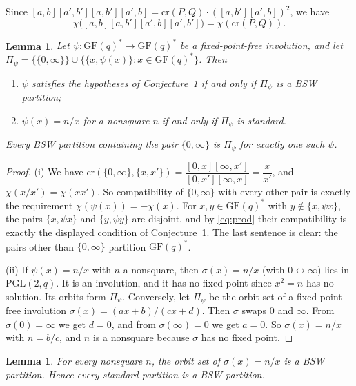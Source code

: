 \documentclass[11pt,a4paper]{article}
\newtheorem{lemma}[theorem]{Lemma}
\theoremstyle{definition}
\theoremstyle{remark}
\newcommand{\GF}{\mathrm{GF}}
\newcommand{\PGL}{\mathrm{PGL}}
\newcommand{\cro}{\mathrm{cr}}
\begin{document}
Since $[a,b][a',b'][a,b'][a',b]=\cro(P,Q)\cdot([a,b'][a',b])^2$, we have
\begin{equation}\label{eq:prod}
  \chi\bigl([a,b][a,b'][a',b][a',b']\bigr)=\chi(\cro(P,Q)).
\end{equation}

\begin{lemma}\label{lem:dict}
Let $\psi:\GF(q)^*\to\GF(q)^*$ be a fixed-point-free involution, and let
$\Pi_\psi=\{\{0,\infty\}\}\cup\{\{x,\psi(x)\}:x\in\GF(q)^*\}$. Then
\begin{enumerate}
\item[(i)] $\psi$ satisfies the hypotheses of Conjecture~1 if and only if $\Pi_\psi$ is a BSW partition;
\item[(ii)] $\psi(x)=n/x$ for a nonsquare $n$ if and only if $\Pi_\psi$ is standard.
\end{enumerate}
Every BSW partition containing the pair $\{0,\infty\}$ is $\Pi_\psi$ for exactly one such $\psi$.
\end{lemma}

\begin{proof}
(i) We have $\cro(\{0,\infty\},\{x,x'\})=\dfrac{[0,x][\infty,x']}{[0,x'][\infty,x]}=\dfrac{x}{x'}$, and
$\chi(x/x')=\chi(xx')$. So compatibility of $\{0,\infty\}$ with every other pair is exactly the requirement
$\chi(\psi(x))=-\chi(x)$. For $x,y\in\GF(q)^*$ with $y\notin\{x,\psi x\}$, the pairs $\{x,\psi x\}$ and
$\{y,\psi y\}$ are disjoint, and by \eqref{eq:prod} their compatibility is exactly the displayed condition of
Conjecture~1. The last sentence is clear: the pairs other than $\{0,\infty\}$ partition $\GF(q)^*$.

(ii) If $\psi(x)=n/x$ with $n$ a nonsquare, then $\sigma(x)=n/x$ (with $0\leftrightarrow\infty$) lies in
$\PGL(2,q)$. It is an involution, and it has no fixed point since $x^2=n$ has no solution. Its orbits form
$\Pi_\psi$. Conversely, let $\Pi_\psi$ be the orbit set of a fixed-point-free involution $\sigma(x)=(ax+b)/(cx+d)$.
Then $\sigma$ swaps $0$ and $\infty$. From $\sigma(0)=\infty$ we get $d=0$, and from $\sigma(\infty)=0$ we get
$a=0$. So $\sigma(x)=n/x$ with $n=b/c$, and $n$ is a nonsquare because $\sigma$ has no fixed point.
\end{proof}

\begin{lemma}\label{lem:stdbsw}
For every nonsquare $n$, the orbit set of $\sigma(x)=n/x$ is a BSW partition. Hence every standard partition
is a BSW partition.
\end{lemma}
\end{document}
